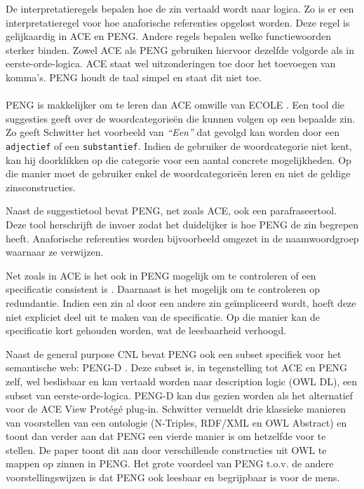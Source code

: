 \documentclass[]{article}
\theoremstyle{definition}
\newcommand{\example}[1]{\textit{``#1''}}
\begin{document}
De interpretatieregels bepalen hoe de zin vertaald wordt naar logica. Zo is er een interpretatieregel voor hoe anaforische referenties opgelost worden. Deze regel is gelijkaardig in ACE en PENG. Andere regels bepalen welke functiewoorden sterker binden. Zowel ACE als PENG gebruiken hiervoor dezelfde volgorde als in eerste-orde-logica. ACE staat wel uitzonderingen toe door het toevoegen van komma's. PENG houdt de taal simpel en staat dit niet toe.

\paragraph{} PENG is makkelijker om te leren dan ACE omwille van ECOLE \cite{Schwitter2003}. Een tool die suggesties geeft over de woordcategorieën die kunnen volgen op een bepaalde zin. Zo geeft Schwitter \cite{Schwitter2003} het voorbeeld van \example{Een} dat gevolgd kan worden door een \texttt{adjectief} of een \texttt{substantief}. Indien de gebruiker de woordcategorie niet kent, kan hij doorklikken op die categorie voor een aantal concrete mogelijkheden. Op die manier moet de gebruiker enkel de woordcategorieën leren en niet de geldige zinsconstructies.

Naast de suggestietool bevat PENG, net zoals ACE, ook een parafraseertool. Deze tool herschrijft de invoer zodat het duidelijker is hoe PENG de zin begrepen heeft. Anaforische referenties worden bijvoorbeeld omgezet in de naamwoordgroep waarnaar ze verwijzen.

Net zoals in ACE is het ook in PENG mogelijk om te controleren of een specificatie consistent is \cite{Schwitter2004b}. Daarnaast is het mogelijk om te controleren op redundantie. Indien een zin al door een andere zin geïmpliceerd wordt, hoeft deze niet expliciet deel uit te maken van de specificatie. Op die manier kan de specificatie kort gehouden worden, wat de leesbaarheid verhoogd.

Naast de general purpose CNL bevat PENG ook een subset specifiek voor het semantische web: PENG-D \cite{Schwitter2004}. Deze subset is, in tegenstelling tot ACE en PENG zelf, wel beslisbaar en kan vertaald worden naar description logic (OWL DL), een subset van eerste-orde-logica. PENG-D kan dus gezien worden als het alternatief voor de ACE View Protégé plug-in.
Schwitter \cite{Schwitter2006} vermeldt drie klassieke manieren van voorstellen van een ontologie (N-Triples, RDF/XML en OWL Abstract) en toont dan verder aan dat PENG een vierde manier is om hetzelfde voor te stellen. De paper toont dit aan door verschillende constructies uit OWL te mappen op zinnen in PENG. Het grote voordeel van PENG t.o.v. de andere voorstellingswijzen is dat PENG ook leesbaar en begrijpbaar is voor de mens.
\end{document}

